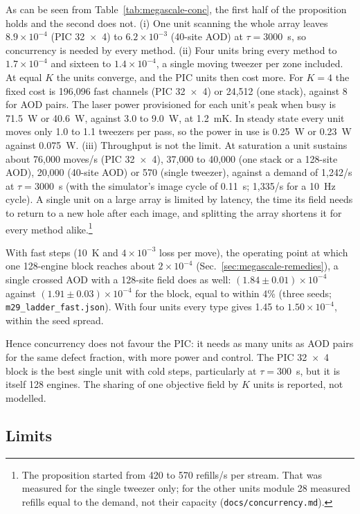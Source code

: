 As can be seen from Table~\ref{tab:megascale-conc}, the first half of the proposition holds and the second does not. (i) One unit scanning the whole array leaves $8.9\times10^{-4}$ (PIC 32~$\times$~4) to $6.2\times10^{-3}$ (40-site AOD) at $\tau=3000$~s, so concurrency is needed by every method. (ii) Four units bring every method to $1.7\times10^{-4}$ and sixteen to $1.4\times10^{-4}$, a single moving tweezer per zone included. At equal $K$ the units converge, and the PIC units then cost more. For $K=4$ the fixed cost is 196,096 fast channels (PIC 32~$\times$~4) or 24,512 (one stack), against 8 for AOD pairs. The laser power provisioned for each unit's peak when busy is 71.5~W or 40.6~W, against 3.0 to 9.0~W, at 1.2~mK. In steady state every unit moves only 1.0 to 1.1 tweezers per pass, so the power in use is 0.25~W or 0.23~W against 0.075~W. (iii) Throughput is not the limit. At saturation a unit sustains about 76,000 moves/s (PIC 32~$\times$~4), 37,000 to 40,000 (one stack or a 128-site AOD), 20,000 (40-site AOD) or 570 (single tweezer), against a demand of 1,242/s at $\tau=3000$~s (with the simulator's image cycle of 0.11~s; 1,335/s for a 10~Hz cycle). A single unit on a large array is limited by latency, the time its field needs to return to a new hole after each image, and splitting the array shortens it for every method alike.\footnote{The proposition started from 420 to 570 refills/s per stream. That was measured for the single tweezer only; for the other units module 28 measured refills equal to the demand, not their capacity (\texttt{docs/\allowbreak concurrency.md}).}

With fast steps (10~\textmu K and $4\times10^{-3}$ loss per move), the operating point at which one 128-engine block reaches about $2\times10^{-4}$ (Sec.~\ref{sec:megascale-remedies}), a single crossed AOD with a 128-site field does as well: $(1.84\pm0.01)\times10^{-4}$ against $(1.91\pm0.03)\times10^{-4}$ for the block, equal to within 4\% (three seeds; \texttt{m29\_ladder\_fast.json}). With four units every type gives 1.45 to $1.50\times10^{-4}$, within the seed spread.

Hence concurrency does not favour the PIC: it needs as many units as AOD pairs for the same defect fraction, with more power and control. The PIC 32~$\times$~4 block is the best single unit with cold steps, particularly at $\tau=300$~s, but it is itself 128 engines. The sharing of one objective field by $K$ units is reported, not modelled.

\subsection{Limits}\label{sec:megascale-limits}

